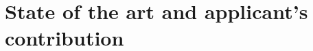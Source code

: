 \documentclass[a4paper,11pt]{article}
\begin{document}
%
%
\section{State of the art and applicant's contribution}
%
%
\end{document}
